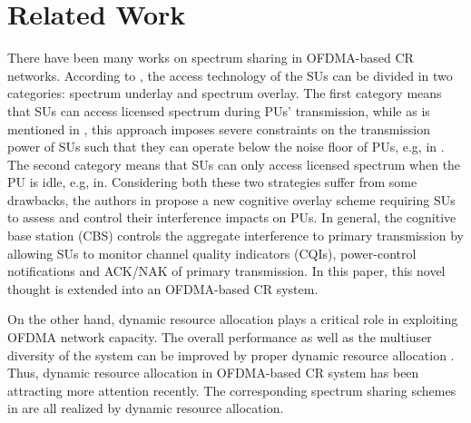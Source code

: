 \documentclass[journal]{IEEEtran}
\begin{document}
\section{Related Work}
There have been many works on spectrum sharing in OFDMA-based CR
networks\cite{almalfouh2011interference,zhang2009resource,zhang2009cross}. According to
\cite{wang2011advances,zhao2007survey}, the access technology of the SUs can be divided in two
categories: spectrum underlay and spectrum overlay. The first category means that SUs can access licensed spectrum during
PUs' transmission, while as is mentioned in \cite{zhao2007survey}, this approach imposes severe constraints on the
transmission power of SUs such that they can operate below the noise floor of PUs, e.g, in
\cite{huang2005spectrum,le2007qos,almalfouh2011interference}.  The second category means that SUs can only
access licensed spectrum when the PU is idle, e.g,
in\cite{levorato2012cognitive,huang2010distributed,georgiadis2006resource,zhang2009resource,zhang2009cross}. Considering
both these two strategies suffer from some drawbacks, the authors in  \cite{lapiccirella2013distributed} propose a new cognitive overlay
scheme requiring SUs to assess and control their interference impacts on PUs. In general, the cognitive base station (CBS) controls the
aggregate interference to primary transmission by allowing SUs to monitor channel quality indicators (CQIs), power-control
notifications and ACK/NAK of primary transmission. In this paper, this novel thought is extended into an OFDMA-based
CR system.


 On the other hand, dynamic resource allocation plays a critical  role in exploiting OFDMA network capacity.  The overall performance as well as the multiuser diversity of the system  can be improved by proper dynamic resource allocation
 \cite{jang2003transmit,kim2005downlink,seong2006optimal,zou2010network,xingzheng2012flow,shen2005adaptive,georgiadis2006resource,li2003dynamic}. Thus,
 dynamic resource allocation in OFDMA-based CR system has been attracting more attention recently. The corresponding spectrum sharing schemes in
 \cite{almalfouh2011interference,zhang2009resource,zhang2009cross} are all realized by dynamic resource
 allocation.
\end{document}
